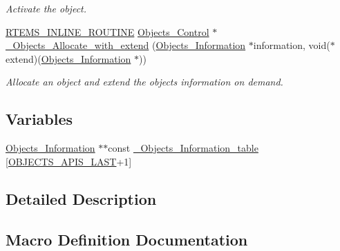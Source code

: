 \begin{DoxyCompactItemize}
\begin{DoxyCompactList}\small\item\em Activate the object. \end{DoxyCompactList}\item 
\mbox{\hyperlink{group__RTEMSScoreBaseDefs_gac216239df231d5dbd15e3520b0b9313f}{R\+T\+E\+M\+S\+\_\+\+I\+N\+L\+I\+N\+E\+\_\+\+R\+O\+U\+T\+I\+NE}} \mbox{\hyperlink{structObjects__Control}{Objects\+\_\+\+Control}} $\ast$ \mbox{\hyperlink{group__RTEMSScoreObject_gaa0886867669718ead9e2a6f6616b40a0}{\+\_\+\+Objects\+\_\+\+Allocate\+\_\+with\+\_\+extend}} (\mbox{\hyperlink{structObjects__Information}{Objects\+\_\+\+Information}} $\ast$information, void($\ast$extend)(\mbox{\hyperlink{structObjects__Information}{Objects\+\_\+\+Information}} $\ast$))
\begin{DoxyCompactList}\small\item\em Allocate an object and extend the objects information on demand. \end{DoxyCompactList}\end{DoxyCompactItemize}
\subsection*{Variables}
\begin{DoxyCompactItemize}
\item 
\mbox{\hyperlink{structObjects__Information}{Objects\+\_\+\+Information}} $\ast$$\ast$const \mbox{\hyperlink{group__RTEMSScoreObject_ga3d8cc86c421588f6c0d789a3374ebf79}{\+\_\+\+Objects\+\_\+\+Information\+\_\+table}} \mbox{[}\mbox{\hyperlink{group__RTEMSScoreObject_ga238bef3e73c68907c9fbc51497250c13}{O\+B\+J\+E\+C\+T\+S\+\_\+\+A\+P\+I\+S\+\_\+\+L\+A\+ST}}+1\mbox{]}
\end{DoxyCompactItemize}


\subsection{Detailed Description}


\subsection{Macro Definition Documentation}
\mbox{\label{group__RTEMSScoreObject_ga96bdcf529c56b52cab7504a171d26211}} 
